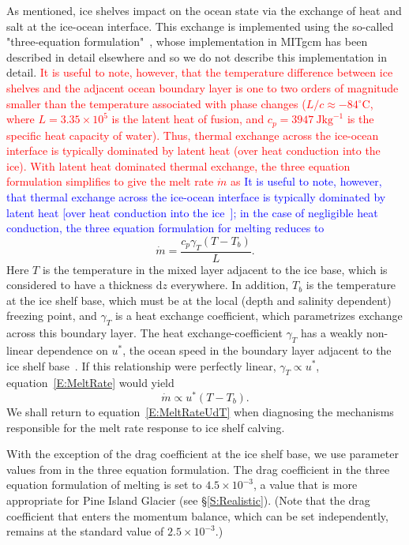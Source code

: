 \documentclass[draft]{agujournal2019}
\newcommand{\red}[1]{\textcolor{red}{#1}}
\newcommand{\blue}[1]{\textcolor{blue}{#1}}
\begin{document}
As mentioned, ice shelves impact on the ocean state via the exchange of heat and salt at the ice-ocean interface. This exchange is implemented using the so-called "three-equation formulation"~\cite{Holland1999JPhysOcean}, whose implementation in MITgcm has been described in detail elsewhere \cite[for example]{Losch2008JGeophysResOceans, DeRydt2014JGeophysResOceans,Dansereau2014JGROceans} and so we do not describe this implementation in detail. \red{It is useful to note, however, that the temperature difference between ice shelves and the adjacent ocean boundary layer is one to two orders of magnitude smaller than the temperature associated with phase changes ($L/c \approx -84{}^\circ$C, where $L=3.35\times10^5$ is the latent heat of fusion, and $c_p=3947~\si{\joule \kilogram}^{-1}$ is the specific heat capacity of water). Thus, thermal exchange across the ice-ocean interface is typically dominated by latent heat (over heat conduction into the ice). With latent heat dominated thermal exchange, the three equation formulation simplifies to give the melt rate $\dot{m}$ as}
\blue{It is useful to note, however, that thermal exchange across the ice-ocean interface is typically dominated by latent heat [over heat conduction into the ice~\cite{Holland1999JPhysOcean}]; in the case of negligible heat conduction, the three equation formulation for melting reduces to}
\begin{equation}\label{E:MeltRate}
    \dot{m} = \frac{c_p \gamma_T (T - T_b)}{L}.
\end{equation}
Here $T$ is the temperature in the mixed layer adjacent to the ice base, which is considered to have a thickness $\mathrm{d}z$ everywhere. In addition, $T_b$ is the temperature at the ice shelf base, which must be at the local (depth and salinity dependent) freezing point, and $\gamma_T$ is a heat exchange coefficient, which parametrizes exchange across this boundary layer. The heat exchange-coefficient $\gamma_T$ has a weakly non-linear dependence on $u^*$, the ocean speed in the boundary layer adjacent to the ice shelf base~\cite{Holland1999JPhysOcean}. If this relationship were perfectly linear, $\gamma_T \propto u^*$, equation~\eqref{E:MeltRate} would yield
\begin{equation}\label{E:MeltRateUdT}
    \dot{m} \propto u^* (T - T_b).
\end{equation}
We shall return to equation~\eqref{E:MeltRateUdT} when diagnosing the mechanisms responsible for the melt rate response to ice shelf calving.

With the exception of the drag coefficient at the ice shelf base, we use parameter values from  in the three equation formulation. The drag coefficient in the three equation formulation of melting is set to $4.5\times10^{-3}$, a value that is more appropriate for Pine Island Glacier (see \S\ref{S:Realistic}). (Note that the drag coefficient that enters the momentum balance, which can be set independently, remains at the standard value of $2.5\times 10^{-3}$.)
\end{document}

